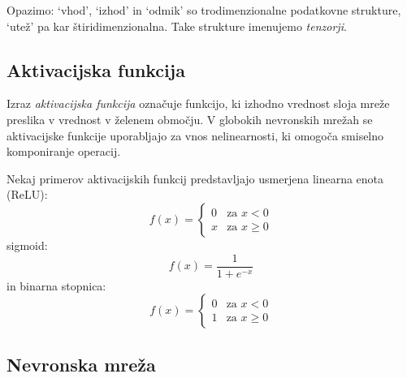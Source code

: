 \documentclass[a4paper,11pt,titlepage]{article}
\begin{document}
Opazimo: `vhod', `izhod' in `odmik' so trodimenzionalne podatkovne strukture, `utež' pa kar štiridimenzionalna.
Take strukture imenujemo \emph{tenzorji}.

\subsection{Aktivacijska funkcija}

Izraz \emph{aktivacijska funkcija} označuje funkcijo, ki izhodno vrednost sloja mreže preslika v vrednost v želenem območju.\cite{activation_func_1}
V globokih nevronskih mrežah se aktivacijske funkcije uporabljajo za vnos nelinearnosti,
	ki omogoča smiselno komponiranje operacij.\cite{activation_func_2}

Nekaj primerov aktivacijskih funkcij predstavljajo usmerjena linearna enota (ReLU):
\begin{equation*} 
f(x) = \begin{cases}
	0 & \text{za } x < 0 \\
	x & \text{za } x \ge 0
\end{cases}
\end{equation*}
sigmoid:
\begin{equation*} 
f(x) = \frac{1}{1 + e^{-x}}
\end{equation*}
in binarna stopnica:
\begin{equation*} 
f(x) = \begin{cases}
	0 & \text{za } x < 0 \\
	1 & \text{za } x \ge 0
\end{cases}
\end{equation*}

\subsection{Nevronska mreža}
\end{document}
